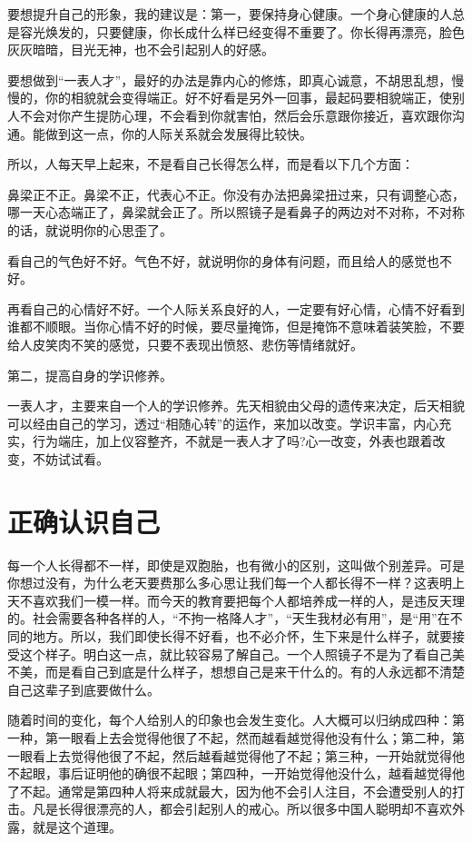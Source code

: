 \documentclass[fontset=fandol, a4paper, 12pt, openright]{ctexbook}
\begin{document}
要想提升自己的形象，我的建议是：第一，要保持身心健康。一个身心健康的人总是容光焕发的，只要健康，你长成什么样已经变得不重要了。你长得再漂亮，脸色灰灰暗暗，目光无神，也不会引起别人的好感。

要想做到“一表人才”，最好的办法是靠内心的修炼，即真心诚意，不胡思乱想，慢慢的，你的相貌就会变得端正。好不好看是另外一回事，最起码要相貌端正，使别人不会对你产生提防心理，不会看到你就害怕，然后会乐意跟你接近，喜欢跟你沟通。能做到这一点，你的人际关系就会发展得比较快。

所以，人每天早上起来，不是看自己长得怎么样，而是看以下几个方面：

鼻梁正不正。鼻梁不正，代表心不正。你没有办法把鼻梁扭过来，只有调整心态，哪一天心态端正了，鼻梁就会正了。所以照镜子是看鼻子的两边对不对称，不对称的话，就说明你的心思歪了。

看自己的气色好不好。气色不好，就说明你的身体有问题，而且给人的感觉也不好。

再看自己的心情好不好。一个人际关系良好的人，一定要有好心情，心情不好看到谁都不顺眼。当你心情不好的时候，要尽量掩饰，但是掩饰不意味着装笑脸，不要给人皮笑肉不笑的感觉，只要不表现出愤怒、悲伤等情绪就好。

第二，提高自身的学识修养。

一表人才，主要来自一个人的学识修养。先天相貌由父母的遗传来决定，后天相貌可以经由自己的学习，透过“相随心转”的运作，来加以改变。学识丰富，内心充实，行为端庄，加上仪容整齐，不就是一表人才了吗?心一改变，外表也跟着改变，不妨试试看。

\section{正确认识自己}

每一个人长得都不一样，即使是双胞胎，也有微小的区别，这叫做个别差异。可是你想过没有，为什么老天要费那么多心思让我们每一个人都长得不一样？这表明上天不喜欢我们一模一样。而今天的教育要把每个人都培养成一样的人，是违反天理的。社会需要各种各样的人，“不拘一格降人才”，“天生我材必有用”，是“用”在不同的地方。所以，我们即使长得不好看，也不必介怀，生下来是什么样子，就要接受这个样子。明白这一点，就比较容易了解自己。一个人照镜子不是为了看自己美不美，而是看自己到底是什么样子，想想自己是来干什么的。有的人永远都不清楚自己这辈子到底要做什么。

随着时间的变化，每个人给别人的印象也会发生变化。人大概可以归纳成四种：第一种，第一眼看上去会觉得他很了不起，然而越看越觉得他没有什么；第二种，第一眼看上去觉得他很了不起，然后越看越觉得他了不起；第三种，一开始就觉得他不起眼，事后证明他的确很不起眼；第四种，一开始觉得他没什么，越看越觉得他了不起。通常是第四种人将来成就最大，因为他不会引人注目，不会遭受别人的打击。凡是长得很漂亮的人，都会引起别人的戒心。所以很多中国人聪明却不喜欢外露，就是这个道理。
\end{document}
